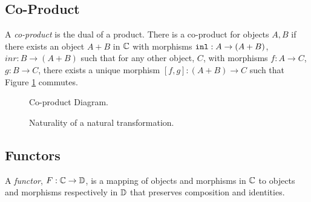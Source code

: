 \subsection{Co-Product}
A \textit{co-product} is the dual of a product. There is a co-product for objects $A, B$ if there exists an object $A+B$ in $\mathbb{C}$ with morphisms $\texttt{inl}: A\rightarrow (A+B)$, $inr: B\rightarrow (A+B)$ such that for any other object, $C$, with morphisms $f: A\rightarrow C$, $g: B\rightarrow C$, there exists a unique morphism $[f, g]: (A + B)\rightarrow C $ such that Figure \ref{CoproductDiagram} commutes.

\begin{minipage}{0.47\linewidth}
    \begin{figure}[H]
        \centering
        \begin{framed}
        \end{framed}
        \caption{Co-product Diagram.}
        \label{CoproductDiagram}
    \end{figure}
\end{minipage}\quad
\begin{minipage}{0.47\linewidth}
    \begin{figure}[H]
        \centering
        \begin{framed}
        \end{framed}
        \caption{Naturality of a natural transformation.}
        \label{Naturality}
    \end{figure}
\end{minipage}\quad

\subsection{Functors}
A \textit{functor}, $F: \mathbb{C} \rightarrow \mathbb{D}$, is a mapping of objects and morphisms in $\mathbb{C}$ to objects and morphisms respectively in $\mathbb{D}$ that preserves composition and identities.

